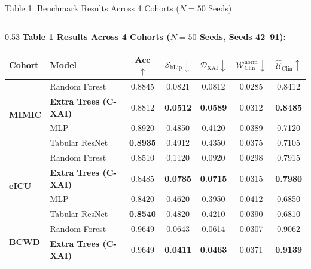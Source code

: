 \documentclass[aspectratio=169,10pt]{beamer}
\begin{document}
\begin{frame}{Table 1: Benchmark Results Across 4 Cohorts ($N = 50$ Seeds)}
  \vspace{-0.1cm}
  \begin{columns}[t]
    \begin{column}{0.53\textwidth}
      \textbf{\scriptsize Table 1 Results Across 4 Cohorts ($N=50$ Seeds, Seeds 42--91):}
      \vspace{0.02cm}
      \begin{table}[h]
        \centering
        \setlength{\tabcolsep}{1.8pt}
        \fontsize{5.2pt}{6.2pt}\selectfont
        \begin{tabular}{llccccc}
          \toprule
          \textbf{Cohort} & \textbf{Model} & \textbf{Acc $\uparrow$} & \textbf{$\mathcal{S}_{\text{bLip}} \downarrow$} & \textbf{$\mathcal{D}_{\text{XAI}} \downarrow$} & \textbf{$\mathcal{W}_{\text{Clin}}^{\text{norm}} \downarrow$} & \textbf{$\widehat{\mathcal{U}}_{\text{Clin}} \uparrow$} \\
          \midrule
          \multirow{4}{*}{\textbf{MIMIC}} 
          & Random Forest & 0.8845 & 0.0821 & 0.0812 & 0.0285 & 0.8412 \\
          & \textbf{Extra Trees (C-XAI)} & 0.8812 & \textbf{0.0512} & \textbf{0.0589} & 0.0312 & \textbf{0.8485} \\
          & MLP & 0.8920 & 0.4850 & 0.4120 & 0.0389 & 0.7120 \\
          & Tabular ResNet & \textbf{0.8935} & 0.4912 & 0.4350 & 0.0375 & 0.7105 \\
          \midrule
          \multirow{4}{*}{\textbf{eICU}} 
          & Random Forest & 0.8510 & 0.1120 & 0.0920 & 0.0298 & 0.7915 \\
          & \textbf{Extra Trees (C-XAI)} & 0.8485 & \textbf{0.0785} & \textbf{0.0715} & 0.0315 & \textbf{0.7980} \\
          & MLP & 0.8420 & 0.4620 & 0.3950 & 0.0412 & 0.6850 \\
          & Tabular ResNet & \textbf{0.8540} & 0.4820 & 0.4210 & 0.0390 & 0.6810 \\
          \midrule
          \multirow{4}{*}{\textbf{BCWD}} 
          & Random Forest & 0.9649 & 0.0643 & 0.0614 & 0.0307 & 0.9062 \\
          & \textbf{Extra Trees (C-XAI)} & 0.9649 & \textbf{0.0411} & \textbf{0.0463} & 0.0371 & \textbf{0.9139} \\

\end{tabular}
\end{table}
\end{column}
\end{columns}
\end{frame}
\end{document}
